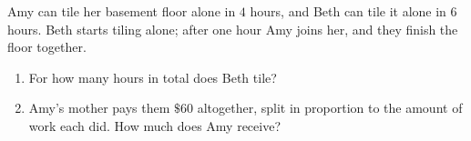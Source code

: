 Amy can tile her basement floor alone in $4$ hours, and Beth can tile it alone in $6$ hours. Beth starts tiling alone; after one hour Amy joins her, and they finish the floor together.
\begin{enumerate}
\item[(a)] For how many hours in total does Beth tile?
\item[(b)] Amy's mother pays them $\$60$ altogether, split in proportion to the amount of work each did. How much does Amy receive?
\end{enumerate}
